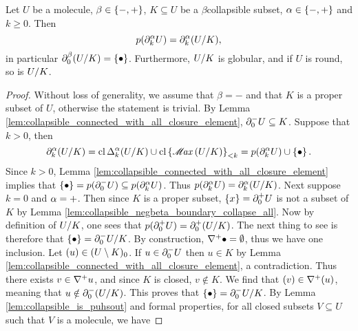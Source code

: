 \begin{lem} \label{lem:collapsible_mapcoll_preserve_boundaries}
    Let \( U \) be a molecule, \( \beta \in \set{-, +} \), \( K \subseteq U \) be a \( \beta \)\nbd collapsible subset, \( \a \in \set{-, +} \) and \( k \geq 0 \).
    Then 
    \begin{equation*}
        \mapcoll (\bd{k}{\a} U) = \bd{k}{\a} (\coll{K}{U}),
    \end{equation*}
    in particular \( \bd{0}{\beta} (\coll{K}{U}) = \set{\zcoll} \).
    Furthermore, \( \coll{K}{U} \) is globular, and if \( U \) is round, so is \( \coll{K}{U} \).
\end{lem}
\begin{proof}
    Without loss of generality, we assume that \( \beta = - \) and that \( K \) is a proper subset of \( U \), otherwise the statement is trivial.
    By Lemma \ref{lem:collapsible_connected_with_all_closure_element}, \( \bd{0}{-} U \subseteq K \).
    Suppose that \( k > 0 \), then
    \begin{equation*}
        \bd{k}{\a} (\coll{K}{U}) = \clos \faces{k}{\a} (\coll{K}{U}) \cup \gr{< k}{\clset{\maxel (\coll{K}{U})}} = \mapcoll(\bd{k}{\a} U) \cup \set{\zcoll}.
    \end{equation*}
    Since \( k > 0 \), Lemma \ref{lem:collapsible_connected_with_all_closure_element} implies that \( \set{\zcoll} = p(\bd{0}{-} U) \subseteq p(\bd{k}{\a} U) \).
    Thus \(  \mapcoll (\bd{k}{\a} U) = \bd{k}{\a} (\coll{K}{U}) \).
    Next suppose \( k = 0 \) and \( \a = + \).
    Then since \( K \) is a proper subset, \( \set{x} = \bd{0}{+} U \) is not a subset of \( K \) by Lemma \ref{lem:collapsible_negbeta_boundary_collapse_all}. 
    Now by definition of \( \coll{K}{U} \), one sees that \( \mapcoll (\bd{0}{+} U) = \bd{0}{+} (\coll{K}{U}) \).
    The next thing to see is therefore that \( \set{\zcoll} = \bd{0}{-} \coll{K}{U} \).
    By construction, \( \cofaces{}{+} \zcoll = \emptyset \), thus we have one inclusion.
    Let \( \icoll{u} \in \gr{0}{(U \setminus K)} \).
    If \( u \in \bd{0}{-} U \) then \( u \in K \) by Lemma \ref{lem:collapsible_connected_with_all_closure_element}, a contradiction.
    Thus there exists \( v \in \cofaces{}{+} u \), and since \( K \) is closed, \( v \notin K \).
    We find that \( \icoll{v} \in \cofaces{}{+} \icoll{u} \), meaning that \( u \notin \bd{0}{-} (\coll{K}{U}) \).
    This proves that \( \set{\zcoll} = \bd{0}{-} \coll{K}{U} \).
    By Lemma \ref{lem:collapsible_is_puhsout} and formal properties, for all closed subsets \( V \subseteq U \) such that \( V \) is a molecule, we have 

\end{proof}

